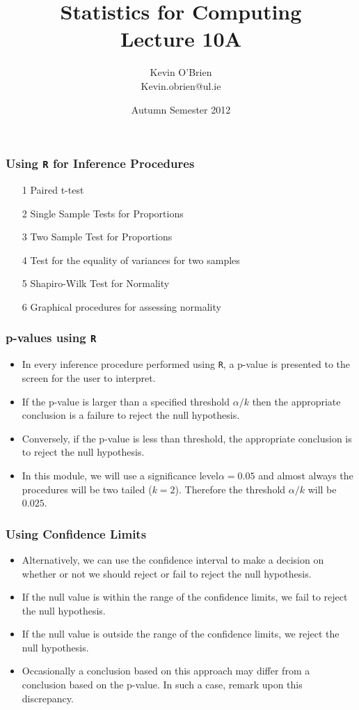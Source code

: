 \documentclass[a4]{beamer}
\title[MA4413]{Statistics for Computing \\ {\normalsize Lecture 10A}}
\author[Kevin O'Brien]{Kevin O'Brien \\ {\scriptsize Kevin.obrien@ul.ie}}
\date{Autumn Semester 2012}
\institute[Maths \& Stats]{Dept. of Mathematics \& Statistics, \\ University \textit{of} Limerick}
\begin{document}
\begin{frame}
\titlepage
\end{frame}

\begin{frame}
\frametitle{Using \texttt{R} for Inference Procedures}
\begin{itemize}
\item[1] Paired t-test
\item[2] Single Sample Tests for Proportions
\item[3] Two Sample Test for Proportions
\item[4] Test for the equality of variances for two samples
\item[5] Shapiro-Wilk Test for Normality
\item[6] Graphical procedures for assessing normality
\end{itemize}
\end{frame}
\begin{frame}
\frametitle{p-values using \texttt{R}}
\begin{itemize}
\item In every inference procedure performed using \texttt{R}, a p-value is presented to the screen for the user to interpret.

\item If the p-value is larger than a specified threshold $\alpha/k$ then the appropriate conclusion is a
failure to reject the null hypothesis.

\item Conversely, if the p-value is less than threshold, the appropriate conclusion is to reject the null hypothesis.

\item In this module, we will use a significance level$\alpha=0.05$ and almost always the procedures will be two tailed ($k=2$). Therefore the threshold $\alpha/k$ will be $0.025$.
\end{itemize}
\end{frame}

\begin{frame}
\frametitle{Using Confidence Limits}
\begin{itemize}
\item Alternatively, we can use the confidence interval to make a decision on whether or not we should reject or fail to reject the null hypothesis.
\item If the null value is within the range of the confidence limits, we fail to reject the null hypothesis.
\item If the null value is outside the range of the confidence limits, we reject the null hypothesis.
\item Occasionally a conclusion based on this approach may differ from a conclusion based on the p-value. In such a case, remark upon this discrepancy.
\end{itemize}
\end{frame}
\end{document}
